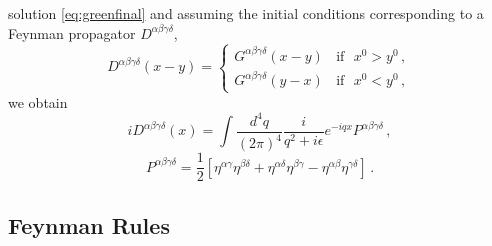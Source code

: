 \documentclass[12pt]{article}
\newcommand{\be}{\begin{equation}}
\newcommand{\ee}{\end{equation}}
\begin{document}
solution \eqref{eq:greenfinal} and assuming the initial conditions corresponding to a Feynman propagator $D^{\alpha\beta\gamma\delta}$,
\be
 D^{\alpha\beta\gamma\delta}(x-y)=
 \begin{cases}
G^{\alpha\beta\gamma\delta}(x-y)~~~~\mathrm{if}~~~ x^0> y^0\,,\\
G^{\alpha\beta\gamma\delta}(y-x)~~~~\mathrm{if}~~~ x^0< y^0\,,
 \end{cases}
\ee
we obtain
\begin{equation}
iD^{\alpha\beta\gamma\delta}(x)=\int\dfrac{d^4q}{(2\pi)^4}\dfrac{i}{q^2+i\epsilon}e^{-iqx}P^{\alpha\beta\gamma\delta} \,,
\end{equation}
\begin{equation}\label{P}
P^{\alpha\beta\gamma\delta}=\dfrac{1}{2}\left[\eta^{\alpha\gamma}\eta^{\beta\delta}+\eta^{\alpha\delta}\eta^{\beta\gamma}-\eta^{\alpha\beta}\eta^{\gamma\delta}\right] \,.
\end{equation}

\subsection{Feynman Rules}
\end{document}
